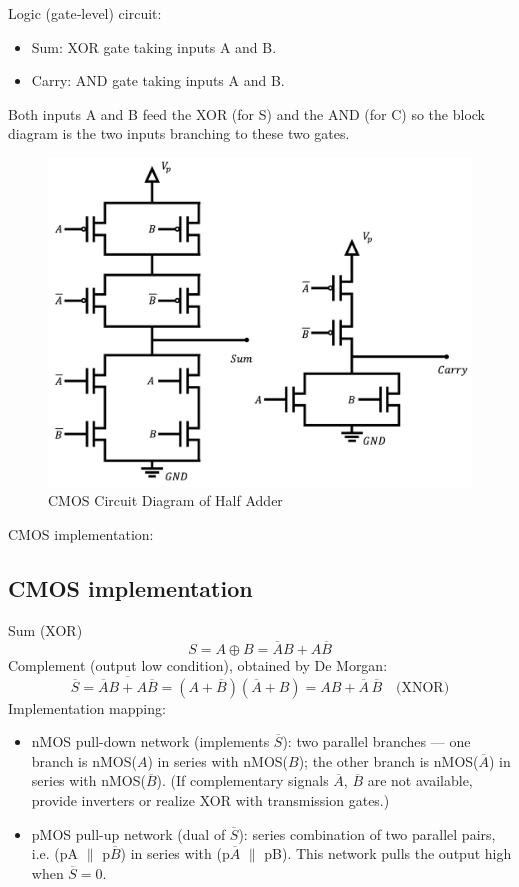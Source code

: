 \documentclass[12pt]{article}
\begin{document}
Logic (gate‑level) circuit:
\begin{itemize}
  \item Sum: XOR gate taking inputs A and B.
  \item Carry: AND gate taking inputs A and B.
\end{itemize}
Both inputs A and B feed the XOR (for S) and the AND (for C) so the block diagram is the two inputs branching to these two gates.

\begin{figure}[H]
  \centering
  \includegraphics[width=.7\textwidth]{ckt.png}
  \caption{CMOS Circuit Diagram of Half Adder}
\end{figure}

CMOS implementation\cite{BibEntry2025Oct}:
\subsection*{CMOS implementation}

Sum (XOR)
\[
  S = A \oplus B = \overline{A}B + A\overline{B}
\]
Complement (output low condition), obtained by De Morgan:
\[
  \overline{S} = \overline{\overline{A}B + A\overline{B}}
  = (A + \overline{B})(\overline{A} + B)
  = AB + \overline{A}\,\overline{B}\quad\text{(XNOR)}
\]
Implementation mapping:
\begin{itemize}
  \item nMOS pull-down network (implements $\overline{S}$): two parallel branches --- one branch is nMOS($A$) in series with nMOS($B$); the other branch is nMOS($\overline{A}$) in series with nMOS($\overline{B}$). (If complementary signals $\overline{A}$, $\overline{B}$ are not available, provide inverters or realize XOR with transmission gates.)
  \item pMOS pull-up network (dual of $\overline{S}$): series combination of two parallel pairs, i.e. (pA $\parallel$ p$\overline{B}$) in series with (p$\overline{A}$ $\parallel$ pB). This network pulls the output high when $\overline{S}=0$.
\end{itemize}
\end{document}
